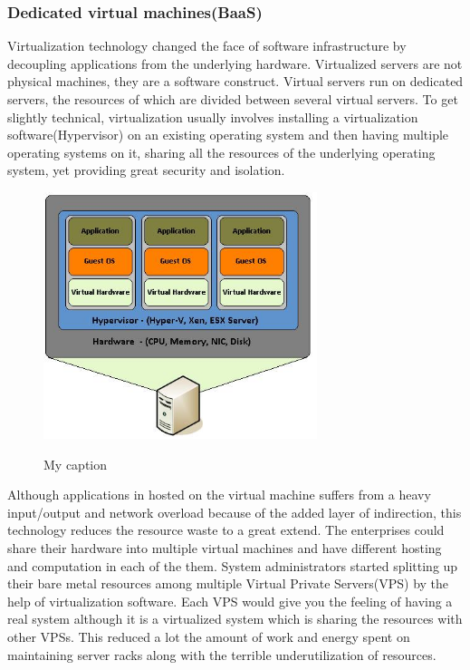 \documentclass[12pt,titlepage]{article}
\begin{document}
\subsubsection{Dedicated virtual machines(BaaS)}
\label{sec:org448a8dc}
Virtualization technology changed the face of software infrastructure by decoupling
applications from the underlying hardware. Virtualized servers are not physical
machines, they are a software construct. Virtual servers run on dedicated
servers, the resources of which are divided between several virtual servers.
To get slightly technical, virtualization usually involves installing a virtualization software(Hypervisor) on an
existing operating system and then having multiple operating systems on it,
sharing all the resources of the underlying operating system, yet providing
great security and isolation.

\begin{figure}[!h]
    \caption{My caption}
    \centering
    \includegraphics[width=80mm]{./thesis_images/virtual_machines.JPG}
    \label{fig:testing the label}
\end{figure}


Although applications in hosted on the virtual machine suffers from a heavy
input/output and network overload because of the added layer of indirection,
this technology reduces the resource waste to a great extend. The enterprises could share their hardware into
multiple virtual machines and have different hosting and computation in each of
the them. System administrators started splitting up their bare metal resources
among multiple Virtual Private Servers(VPS) by the help of virtualization
software. Each VPS would give you the feeling
of having a real system although it is a virtualized system which is sharing the
resources with other VPSs. This reduced a lot the amount of work and energy spent on
maintaining server racks along with the terrible underutilization of resources.
\end{document}
